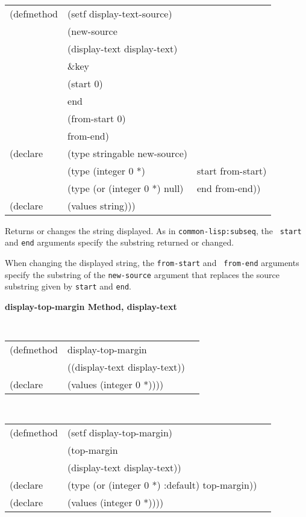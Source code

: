 {\samepage
\begin{flushright} \parbox[t]{6.125in}{
\tt
\begin{tabular}{lll}
\raggedright
(defmethod & (setf display-text-source) & \\
         & (new-source \\
         & (display-text  display-text)\\
&  \&key \\
&   (start 0)\\
&   end\\
&   (from-start 0)\\
&   from-end) \\
(declare &(type stringable  new-source)\\
        &(type (integer 0 *) & start from-start)\\
         &(type (or (integer 0 *) null) & end from-end))\\
(declare & (values string)))
\end{tabular}
\rm}
\end{flushright}}

\begin{flushright} \parbox[t]{6.125in}{
Returns or changes the string displayed. As in {\tt common-lisp:subseq}, the {\tt
start} and {\tt end} arguments specify the substring returned or
changed.

When changing the displayed string, the {\tt from-start} and {\tt
from-end} arguments specify the substring of the {\tt new-source}
argument that replaces the source substring given by {\tt start} and
{\tt end}.}
 \end{flushright}



{\samepage  
{\large {\bf display-top-margin \hfill Method, display-text}}
\begin{flushright} \parbox[t]{6.125in}{
\tt
\begin{tabular}{lll}
\raggedright
(defmethod & display-top-margin & \\
& ((display-text  display-text)) \\
(declare & (values (integer 0 *))))
\end{tabular}
\rm

}\end{flushright}}

\begin{flushright} \parbox[t]{6.125in}{
\tt
\begin{tabular}{lll}
\raggedright
(defmethod & (setf display-top-margin) & \\
         & (top-margin \\
         & (display-text  display-text)) \\
(declare &(type (or (integer 0 *) :default)  top-margin))\\
(declare & (values (integer 0 *))))
\end{tabular}
\rm}
\end{flushright}

